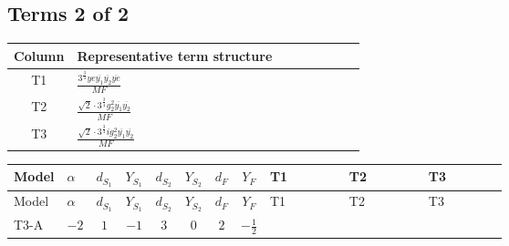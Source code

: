\documentclass[8pt]{article}
\begin{document}
\begin{landscape}
\subsection*{Terms 2 of 2}
\begin{center}
\begin{tabular}{@{}c >{\raggedright\arraybackslash}p{0.82\linewidth}@{}}
\toprule
Column & Representative term structure \\
\midrule
T1 & \(\displaystyle \frac{3^{\frac{3}{4}} ye \overline{y_{1}} \overline{y_{2}} \overline{ye}}{MF}\) \\
\midrule
T2 & \(\displaystyle \frac{\sqrt{2} \cdot 3^{\frac{3}{4}} g_{2}^{2} \overline{y_{1}} \overline{y_{2}}}{MF}\) \\
\midrule
T3 & \(\displaystyle \frac{\sqrt{2} \cdot 3^{\frac{3}{4}} i g_{2}^{2} \overline{y_{1}} \overline{y_{2}}}{MF}\) \\
\midrule
\bottomrule
\end{tabular}
\end{center}
\smallskip
\tiny
\begin{longtable}{@{}llcccccc >{\raggedright\arraybackslash}p{0.21\linewidth} >{\raggedright\arraybackslash}p{0.21\linewidth} >{\raggedright\arraybackslash}p{0.21\linewidth}@{}}
\toprule
Model & $\alpha$ & $d_{S_1}$ & $Y_{S_1}$ & $d_{S_2}$ & $Y_{S_2}$ & $d_F$ & $Y_F$ & T1 & T2 & T3 \\
\midrule
\endfirsthead
\toprule
Model & $\alpha$ & $d_{S_1}$ & $Y_{S_1}$ & $d_{S_2}$ & $Y_{S_2}$ & $d_F$ & $Y_F$ & T1 & T2 & T3 \\
\midrule
\endhead
T3-A & $-2$ & $1$ & $-1$ & $3$ & $0$ & $2$ & $-\frac{1}{2}$ & \scriptsize\adjustbox{max width=\linewidth}{$\begin{gathered} - \frac{3^{\frac{3}{4}} ye \overline{y_{1}} \overline{y_{2}} \overline{ye}}{12 MF}\end{gathered}$} & \scriptsize\adjustbox{max width=\linewidth}{$\begin{gathered} \frac{\sqrt{2} \cdot 3^{\frac{3}{4}} g_{2}^{2} \overline{y_{1}} \overline{y_{2}}}{6 MF}\end{gathered}$} & \scriptsize\adjustbox{max width=\linewidth}{$\begin{gathered} - \frac{\sqrt{2} \cdot 3^{\frac{3}{4}} i g_{2}^{2} \overline{y_{1}} \overline{y_{2}}}{6 MF}\end{gathered}$} \\
\midrule
\bottomrule
\end{longtable}
\clearpage

\end{landscape}
\end{document}
